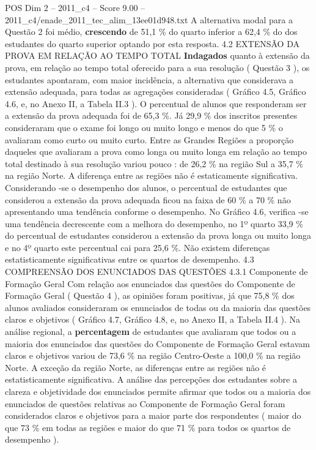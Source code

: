 \begin{textsample}{POS Dim 2 – 2011\_c4 – Score 9.00 – 2011\_c4/enade\_2011\_tec\_alim\_13ee01d948.txt}
A alternativa modal para a Questão 2 foi médio, \textbf{crescendo} de 51,1 \% do quarto inferior a 62,4 \% do dos estudantes do quarto superior optando por esta resposta. 4.2 EXTENSÃO DA PROVA EM RELAÇÃO AO TEMPO TOTAL \textbf{Indagados} quanto à extensão da prova, em relação ao tempo total oferecido para a sua resolução ( Questão 3 ), os estudantes apontaram, com maior incidência, a alternativa que considerava a extensão adequada, para todas as agregações consideradas ( Gráfico 4.5, Gráfico 4.6, e, no Anexo II, a Tabela II.3 ).
O percentual de alunos que responderam ser a extensão da prova adequada foi de 65,3 \%.
Já 29,9 \% dos inscritos presentes consideraram que o exame foi longo ou muito longo e menos do que 5 \% o avaliaram como curto ou muito curto.
Entre as Grandes Regiões a proporção daqueles que avaliaram a prova como longa ou muito longa em relação ao tempo total destinado à sua resolução variou pouco : de 26,2 \% na região Sul a 35,7 \% na região Norte.
A diferença entre as regiões não é estaticamente significativa.
Considerando -se o desempenho dos alunos, o percentual de estudantes que considerou a extensão da prova adequada ficou na faixa de 60 \% a 70 \% não apresentando uma tendência conforme o desempenho.
No Gráfico 4.6, verifica -se uma tendência decrescente com a melhora do desempenho, no 1º quarto 33,9 \% do percentual de estudantes considerou a extensão da prova longa ou muito longa e no 4º quarto este percentual cai para 25,6 \%.
Não existem diferenças estatisticamente significativas entre os quartos de desempenho. 4.3 COMPREENSÃO DOS ENUNCIADOS DAS QUESTÕES 4.3.1 Componente de Formação Geral Com relação aos enunciados das questões do Componente de Formação Geral ( Questão 4 ), as opiniões foram positivas, já que 75,8 \% dos alunos avaliados consideraram os enunciados de todas ou da maioria das questões claros e objetivos ( Gráfico 4.7, Gráfico 4.8, e, no Anexo II, a Tabela II.4 ).
Na análise regional, a \textbf{percentagem} de estudantes que avaliaram que todos ou a maioria dos enunciados das questões do Componente de Formação Geral estavam claros e objetivos variou de 73,6 \% na região Centro-Oeste a 100,0 \% na região Norte.
A exceção da região Norte, as diferenças entre as regiões não é estatisticamente significativa.
A análise das percepções dos estudantes sobre a clareza e objetividade dos enunciados permite afirmar que todos ou a maioria dos enunciados de questões relativas ao Componente de Formação Geral foram considerados claros e objetivos para a maior parte dos respondentes ( maior do que 73 \% em todas as regiões e maior do que 71 \% para todos os quartos de desempenho ).

\end{textsample}
